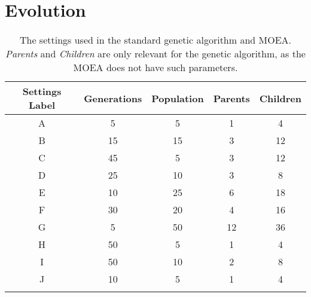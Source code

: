 \section{Evolution}
\label{results_evolution}


\begin{table}
	\begin{center}
	\renewcommand{\arraystretch}{1}
	\caption{The settings used in the standard genetic algorithm and MOEA. \textit{Parents} and \textit{Children} are only relevant for the genetic algorithm, as the MOEA does not have such parameters.}
	\label{tab:results_evolution_combinations}
		\begin{tabular}{| c | c | c | c | c |}
		\hline
		Settings Label & Generations & Population & Parents & Children \\
		\hline
		A & 5 & 5 & 1 & 4 \\
		\hline
		B & 15 & 15 & 3 & 12 \\
		\hline
		C & 45 & 5 & 3 & 12 \\
		\hline
		D & 25 & 10 & 3 & 8 \\
		\hline
		E & 10 & 25 & 6 & 18 \\
		\hline
		F & 30 & 20 & 4 & 16 \\
		\hline
		G & 5 & 50 & 12 & 36 \\
		\hline
		H & 50 & 5 & 1 & 4 \\
		\hline
		I & 50 & 10 & 2 & 8 \\
		\hline
		J & 10 & 5 & 1 & 4 \\




		\hline
		 &  &  &  &  \\
		\hline
		\end{tabular}
	\end{center}
\end{table}

